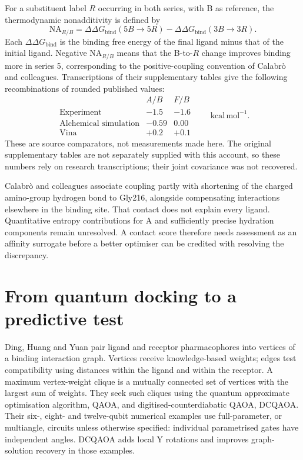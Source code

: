 \documentclass{article}
\begin{document}
For a substituent label \(R\) occurring in both series, with B as reference, the thermodynamic nonadditivity is defined by
\[
 \mathrm{NA}_{R/B}
 =\Delta\Delta G_{\mathrm{bind}}(5B\to5R)
  -\Delta\Delta G_{\mathrm{bind}}(3B\to3R).
\]
Each \(\Delta\Delta G_{\mathrm{bind}}\) is the binding free energy of the final ligand minus that of the initial ligand. Negative \(\mathrm{NA}_{R/B}\) means that the B-to-\(R\) change improves binding more in series 5, corresponding to the positive-coupling convention of Calabr\`o and colleagues.\cite{Q} Transcriptions of their supplementary tables give the following recombinations of rounded published values:
\[
\begin{array}{c|rr}
 & A/B & F/B\\ \hline
\text{Experiment} & -1.5 & -1.6\\
\text{Alchemical simulation} & -0.59 & 0.00\\
\text{Vina} & +0.2 & +0.1
\end{array}
\qquad \mathrm{kcal\,mol^{-1}}.
\]
These are source comparators, not measurements made here. The original supplementary tables are not separately supplied with this account, so these numbers rely on research transcriptions; their joint covariance was not recovered.

Calabr\`o and colleagues associate coupling partly with shortening of the charged amino-group hydrogen bond to Gly216, alongside compensating interactions elsewhere in the binding site. That contact does not explain every ligand. Quantitative entropy contributions for A and sufficiently precise hydration components remain unresolved.\cite{Q} A contact score therefore needs assessment as an affinity surrogate before a better optimiser can be credited with resolving the discrepancy.

\section{From quantum docking to a predictive test}

Ding, Huang and Yuan pair ligand and receptor pharmacophores into vertices of a binding interaction graph. Vertices receive knowledge-based weights; edges test compatibility using distances within the ligand and within the receptor. A maximum vertex-weight clique is a mutually connected set of vertices with the largest sum of weights. They seek such cliques using the quantum approximate optimisation algorithm, QAOA, and digitised-counterdiabatic QAOA, DCQAOA. Their six-, eight- and twelve-qubit numerical examples use full-parameter, or multiangle, circuits unless otherwise specified: individual parametrised gates have independent angles. DCQAOA adds local Y rotations and improves graph-solution recovery in those examples.\cite{P}
\end{document}
